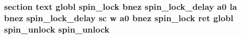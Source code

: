 \hypertarget{riscv_2atomic_8S_aec4be218c3989af0a4d0cd74a975d979}{
\subsubsection[{spin\-\_\-unlock}]{\setlength{\rightskip}{0pt plus 5cm}section text globl {\bf spin\-\_\-lock} {\bf bnez} {\bf spin\-\_\-lock\-\_\-delay} {\bf a0} {\bf la} {\bf bnez} {\bf spin\-\_\-lock\-\_\-delay} {\bf sc} w {\bf a0} {\bf bnez} {\bf spin\-\_\-lock} ret globl spin\-\_\-unlock spin\-\_\-unlock}}\label{riscv_2atomic_8S_aec4be218c3989af0a4d0cd74a975d979}
\hypertarget{riscv_2atomic_8S_ae9747d0e53eec3077df6659993460c34}{
}
